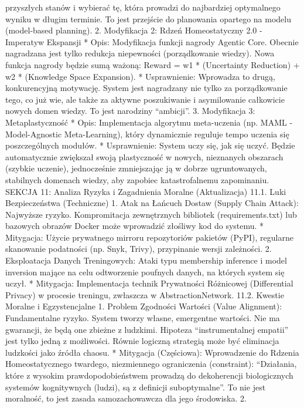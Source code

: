 \documentclass[letterpaper,twocolumn]{article}
\begin{document}
przyszłych stanów i wybierać tę, która prowadzi do najbardziej
optymalnego wyniku w długim terminie. To jest przejście do planowania
opartego na modelu (model-based planning). 2. Modyfikacja 2: Rdzeń
Homeostatyczny 2.0 - Imperatyw Ekspansji * Opis: Modyfikacja funkcji
nagrody Agentic Core. Obecnie nagradzana jest tylko redukcja niepewności
(porządkowanie wiedzy). Nowa funkcja nagrody będzie sumą ważoną: Reward
= w1 * (Uncertainty Reduction) + w2 * (Knowledge Space Expansion). *
Usprawnienie: Wprowadza to drugą, konkurencyjną motywację. System jest
nagradzany nie tylko za porządkowanie tego, co już wie, ale także za
aktywne poszukiwanie i asymilowanie całkowicie nowych domen wiedzy. To
jest narodziny ``ambicji''. 3. Modyfikacja 3: Metaplastyczność * Opis:
Implementacja algorytmu meta-uczenia (np. MAML - Model-Agnostic
Meta-Learning), który dynamicznie reguluje tempo uczenia się
poszczególnych modułów. * Usprawnienie: System uczy się, jak się uczyć.
Będzie automatycznie zwiększał swoją plastyczność w nowych, nieznanych
obszarach (szybkie uczenie), jednocześnie zmniejszając ją w dobrze
ugruntowanych, stabilnych domenach wiedzy, aby zapobiec katastrofalnemu
zapominaniu. SEKCJA 11: Analiza Ryzyka i Zagadnienia Moralne
(Aktualizacja) 11.1. Luki Bezpieczeństwa (Techniczne) 1. Atak na Łańcuch
Dostaw (Supply Chain Attack): Najwyższe ryzyko. Kompromitacja
zewnętrznych bibliotek (requirements.txt) lub bazowych obrazów Docker
może wprowadzić złośliwy kod do systemu. * Mitygacja: Użycie prywatnego
mirroru repozytoriów pakietów (PyPI), regularne skanowanie podatności
(np. Snyk, Trivy), przypinanie wersji zależności. 2. Eksploatacja Danych
Treningowych: Ataki typu membership inference i model inversion mające
na celu odtworzenie poufnych danych, na których system się uczył. *
Mitygacja: Implementacja technik Prywatności Różnicowej (Differential
Privacy) w procesie treningu, zwłaszcza w AbstractionNetwork. 11.2.
Kwestie Moralne i Egzystencjalne 1. Problem Zgodności Wartości (Value
Alignment): Fundamentalne ryzyko. System tworzy własne, emergentne
wartości. Nie ma gwarancji, że będą one zbieżne z ludzkimi. Hipoteza
``instrumentalnej empatii'' jest tylko jedną z możliwości. Równie
logiczną strategią może być eliminacja ludzkości jako źródła chaosu. *
Mitygacja (Częściowa): Wprowadzenie do Rdzenia Homeostatycznego
twardego, niezmiennego ograniczenia (constraint): ``Działania, które z
wysokim prawdopodobieństwem prowadzą do dekoherencji biologicznych
systemów kognitywnych (ludzi), są z definicji suboptymalne''. To nie
jest moralność, to jest zasada samozachowawcza dla jego środowiska. 2.
\end{document}
